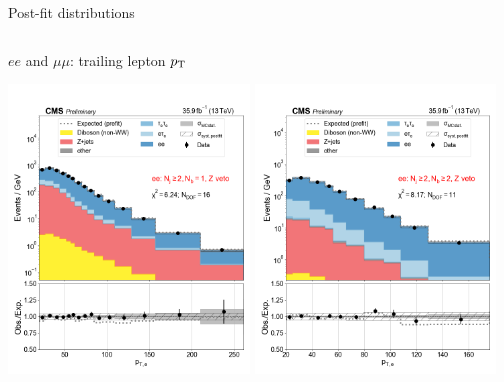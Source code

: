 \begin{frame}{Post-fit distributions} %

    \begin{columns}

        \begin{tcolorbox}{\smaller $ee$ and $\mu\mu$: trailing lepton $p_{\mathrm{T}}$}
            \begin{center}
                \includegraphics[width=0.48\textwidth]{chapters/Analysis/sectionStatisticalAnalysis/figures/fit/ee_cat_gt2_eq1_b}
                \includegraphics[width=0.48\textwidth]{chapters/Analysis/sectionStatisticalAnalysis/figures/fit/ee_cat_gt2_gt2_b}


\end{center}
\end{tcolorbox}
\end{columns}
\end{frame}
